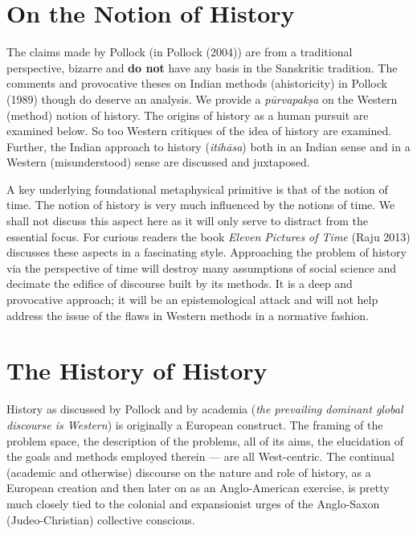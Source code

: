 \section*{On the Notion of History}

The claims made by Pollock (in Pollock (2004)) are from a traditional perspective, bizarre and \textbf{do not} have any basis in the Sanskritic tradition. The comments and provocative theses on Indian methods (ahistoricity) in Pollock (1989) though do deserve an analysis. We provide a \textit{pūrvapakṣa} on the Western (method) notion of history. The origins of history as a human pursuit are examined below. So too Western critiques of the idea of history are examined. Further, the Indian approach to history (\textit{itihāsa}) both in an Indian sense and in a Western (misunderstood) sense are discussed and juxtaposed.

A key underlying foundational metaphysical primitive is that of the notion of time. The notion of history is very much influenced by the notions of time. We shall not discuss this aspect here as it will only serve to distract from the essential focus. For curious readers the book \textit{Eleven Pictures of Time} (Raju 2013) discusses these aspects in a fascinating style. Approaching the problem of history via the perspective of time will destroy many assumptions of social science and decimate the edifice of discourse built by its methods. It is a deep and provocative approach; it will be an epistemological attack and will not help address the issue of the flaws in Western methods in a normative fashion.

\section*{The History of History}

History as discussed by Pollock and by academia (\textit{the prevailing dominant global discourse is Western}) is originally a European construct. The framing of the problem space, the description of the problems, all of its aims, the elucidation of the goals and methods employed therein — are all West-centric. The continual (academic and otherwise) discourse on the nature and role of history, as a European creation and then later on as an Anglo-American exercise, is pretty much closely tied to the colonial and expansionist urges of the Anglo-Saxon (Judeo-Christian) collective conscious.


